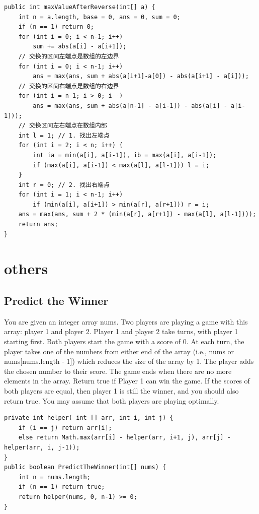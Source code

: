 \documentclass[9pt, b5paaper]{book}
\begin{document}
\begin{verbatim}
public int maxValueAfterReverse(int[] a) { 
    int n = a.length, base = 0, ans = 0, sum = 0;
    if (n == 1) return 0;
    for (int i = 0; i < n-1; i++)
        sum += abs(a[i] - a[i+1]);
    // 交换的区间左端点是数组的左边界
    for (int i = 0; i < n-1; i++) 
        ans = max(ans, sum + abs(a[i+1]-a[0]) - abs(a[i+1] - a[i]));
    // 交换的区间右端点是数组的右边界
    for (int i = n-1; i > 0; i--)
        ans = max(ans, sum + abs(a[n-1] - a[i-1]) - abs(a[i] - a[i-1]));
    // 交换区间左右端点在数组内部
    int l = 1; // 1. 找出左端点
    for (int i = 2; i < n; i++) {
        int ia = min(a[i], a[i-1]), ib = max(a[i], a[i-1]);
        if (max(a[i], a[i-1]) < max(a[l], a[l-1])) l = i;
    }
    int r = 0; // 2. 找出右端点
    for (int i = 1; i < n-1; i++) 
        if (min(a[i], a[i+1]) > min(a[r], a[r+1])) r = i;
    ans = max(ans, sum + 2 * (min(a[r], a[r+1]) - max(a[l], a[l-1])));
    return ans;
}
\end{verbatim}

\chapter{others}
\label{sec-22}
\section{Predict the Winner}
\label{sec-22-1}
You are given an integer array nums. Two players are playing a game with this array: player 1 and player 2.
Player 1 and player 2 take turns, with player 1 starting first. Both players start the game with a score of 0. At each turn, the player takes one of the numbers from either end of the array (i.e., nums\footnotemark[2]{} or nums[nums.length - 1]) which reduces the size of the array by 1. The player adds the chosen number to their score. The game ends when there are no more elements in the array.
Return true if Player 1 can win the game. If the scores of both players are equal, then player 1 is still the winner, and you should also return true. You may assume that both players are playing optimally.
\begin{verbatim}
private int helper( int [] arr, int i, int j) {
    if (i == j) return arr[i];
    else return Math.max(arr[i] - helper(arr, i+1, j), arr[j] - helper(arr, i, j-1));
}
public boolean PredictTheWinner(int[] nums) {
    int n = nums.length;
    if (n == 1) return true;
    return helper(nums, 0, n-1) >= 0;
}
\end{verbatim}
\end{document}
